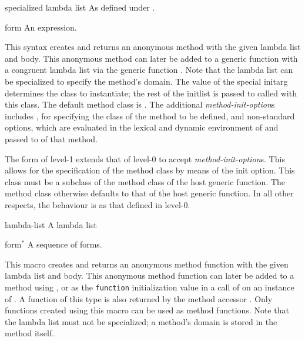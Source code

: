 \begin{optDefinition}
\begin{arguments}
    \item[specialized lambda list] As defined under .

    \item[form] An expression.
\end{arguments}
%
\result%
This syntax creates and returns an anonymous method with the given
lambda list and body.  This anonymous method can later be added to a generic
function with a congruent lambda list via the generic function
.  Note that the lambda list can be specialized to
specify the method's domain.  The value of the special initarg 
determines the class to instantiate; the rest of the initlist is passed to
 called with this class.  The default method class is
.
%
\remarks%
The additional {\em method-init-option\/}s includes , for
specifying the class of the method to be defined, and non-standard
options, which are evaluated in the lexical and dynamic environment of
 and passed to  of that method.

\Syntax
{}%
%
%
\remarks%
The  form of level-1 extends that of level-0 to accept
{\em method-init-option\/}s.  This allows for the specification of the
method class by means of the  init option.  This class must
be a subclass of the method class of the host generic function. The
method class otherwise defaults to that of the host generic function.
In all other respects, the behaviour is as that defined in level-0.

%
\begin{arguments}
    \item[lambda-list] A lambda list
    \item[form$^*$] A sequence of forms.
\end{arguments}
%
This macro creates and returns an anonymous method function with the given
lambda list and body. This anonymous method function can later be added to a
method using , or as the {\tt function}
initialization value in a call of  on an instance of
.  A function of this type is also returned by the method
accessor .  Only functions created using this macro
can be used as method functions.  Note that the lambda list must not be
specialized; a method's domain is stored in the method itself.


\end{optDefinition}
